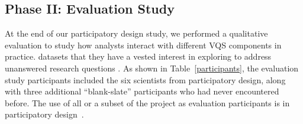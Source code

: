   \subsection{Phase II: Evaluation Study}
  At the end of our participatory design study, we performed a qualitative evaluation to study how analysts interact with different VQS components in practice. datasets that they have a vested interest in exploring to address unanswered research questions . As shown in Table~\ref{participants}, the evaluation study participants included the six scientists from participatory design, along with three additional ``blank-slate'' participants who had never encountered \zvpp before. The use of all or a subset of the project  as evaluation participants is  in participatory design~\cite{Bossen2016}.   %
